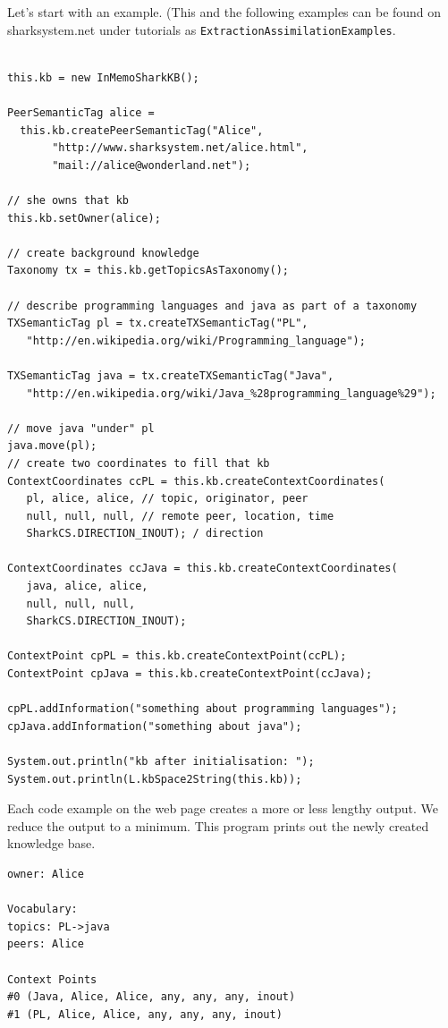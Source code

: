 Let's start with an example. (This and the following examples can be found on sharksystem.net under tutorials as {\tt ExtractionAssimilationExamples}.

\begin{verbatim}

this.kb = new InMemoSharkKB();

PeerSemanticTag alice = 
  this.kb.createPeerSemanticTag("Alice", 
       "http://www.sharksystem.net/alice.html", 
       "mail://alice@wonderland.net");

// she owns that kb
this.kb.setOwner(alice);

// create background knowledge
Taxonomy tx = this.kb.getTopicsAsTaxonomy();

// describe programming languages and java as part of a taxonomy
TXSemanticTag pl = tx.createTXSemanticTag("PL",
   "http://en.wikipedia.org/wiki/Programming_language");

TXSemanticTag java = tx.createTXSemanticTag("Java", 
   "http://en.wikipedia.org/wiki/Java_%28programming_language%29");

// move java "under" pl
java.move(pl);
// create two coordinates to fill that kb
ContextCoordinates ccPL = this.kb.createContextCoordinates(
   pl, alice, alice, // topic, originator, peer
   null, null, null, // remote peer, location, time
   SharkCS.DIRECTION_INOUT); / direction

ContextCoordinates ccJava = this.kb.createContextCoordinates(
   java, alice, alice, 
   null, null, null, 
   SharkCS.DIRECTION_INOUT);

ContextPoint cpPL = this.kb.createContextPoint(ccPL);
ContextPoint cpJava = this.kb.createContextPoint(ccJava);

cpPL.addInformation("something about programming languages");
cpJava.addInformation("something about java");

System.out.println("kb after initialisation: ");
System.out.println(L.kbSpace2String(this.kb));
\end{verbatim}

Each code example on the web page creates a more or less lengthy output. We reduce the output to a minimum. This program prints out the newly created knowledge base.

\begin{verbatim}
owner: Alice

Vocabulary:
topics: PL->java
peers: Alice

Context Points
#0 (Java, Alice, Alice, any, any, any, inout)
#1 (PL, Alice, Alice, any, any, any, inout)
\end{verbatim}

